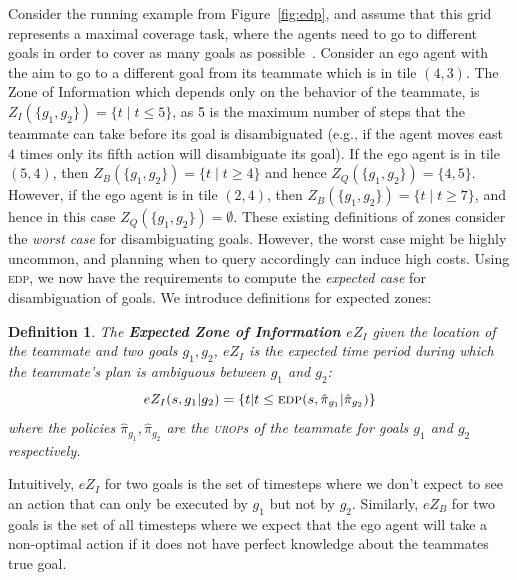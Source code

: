 \documentclass[letterpaper]{article}
\newtheorem{definition}{Definition}
\begin{document}
\noindent  Consider the running example from Figure~\ref{fig:edp}, and assume that this grid represents a maximal coverage task, where the agents need to go to different goals in order to cover as many goals as possible~\cite{pita2008deployed}. Consider an ego agent with the aim to go to a different goal from its teammate which is in tile $(4,3)$. The Zone of Information which depends only on the behavior of the teammate, is $Z_I(\{g_1,g_2\})=\{t \mid t \leq 5\}$, as 5 is the maximum number of steps that the teammate can take before its goal is disambiguated (e.g., if the agent moves east 4 times only its fifth action will disambiguate its goal). If the ego agent is in tile $(5,4)$, then $Z_B(\{g_1,g_2\})=\{t \mid t \geq 4\}$ and hence $Z_Q(\{g_1,g_2\})=\{4,5\}$. However, if the ego agent is in tile $(2,4)$, then $Z_B(\{g_1,g_2\})=\{t \mid t \geq 7\}$, and hence in this case $Z_Q(\{g_1,g_2\})=\emptyset$.
These existing definitions of zones consider the \emph{worst case} for disambiguating goals. However, the worst case might be highly uncommon, and planning when to query accordingly can induce high costs.
Using \textsc{edp}, we now have the requirements to compute the \emph{expected case} for disambiguation of goals. We introduce definitions for expected zones: %
\begin{definition}
The \textbf{Expected Zone of Information $eZ_I$} given the location of the teammate and two goals $g_1, g_2$, $eZ_I$ is the expected time period during which the teammate's plan is ambiguous between $g_1$ and $g_2$:
\begin{equation*}
    eZ_I(s, g_1 | g_2) = \{t| t \leq \textsc{edp}(s, \hat{\pi}_{g_1} | \hat{\pi}_{g_2})\}
\end{equation*}
where the policies $\hat{\pi}_{g_1},\hat{\pi}_{g_2}$ are the \textsc{urop}s of the teammate for goals $g_1$ and $g_2$ respectively.

\end{definition}

\noindent Intuitively, $eZ_I$ for two goals is the set of timesteps where we don't expect to see an action that can only be executed by $g_1$ but not by $g_2$. Similarly, $eZ_B$ for two goals is the set of all timesteps where we expect that the ego agent will take a non-optimal action if it does not have perfect knowledge about the teammates true goal.
\end{document}
